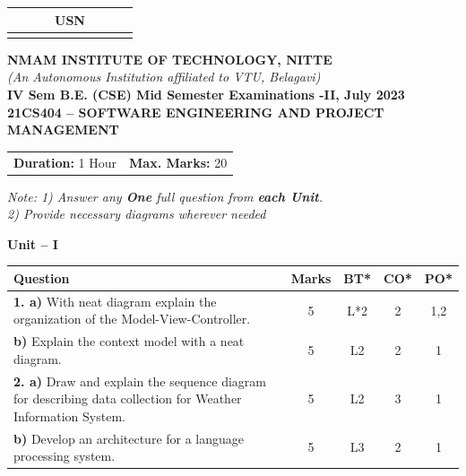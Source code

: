 \documentclass[12pt,a4paper]{article}
\begin{document}
\begin{center}
\begin{tabular}{|c|c|c|c|c|c|c|c|c|c|}
\hline
\multicolumn{10}{|c|}{USN} \\
\hline
& & & & & & & & & \\
\hline
\end{tabular}

\vspace{0.5cm}

{\Large \textbf{NMAM INSTITUTE OF TECHNOLOGY, NITTE}}\\[0.2cm]
{\small \textit{(An Autonomous Institution affiliated to VTU, Belagavi)}}\\[0.3cm]
{\large \textbf{IV Sem B.E. (CSE) Mid Semester Examinations -II, July 2023}}\\[0.2cm]
{\large \textbf{21CS404 -- SOFTWARE ENGINEERING AND PROJECT MANAGEMENT}}\\[0.3cm]
\end{center}

\noindent
\begin{tabular}{p{8cm}r}
\textbf{Duration:} 1 Hour & \textbf{Max. Marks:} 20
\end{tabular}

\vspace{0.3cm}
\begin{center}
\textit{Note: 1) Answer any \textbf{One} full question from \textbf{each Unit}.}\\
\textit{2) Provide necessary diagrams wherever needed}
\end{center}

\vspace{0.3cm}

\begin{center}
{\large \textbf{Unit -- I}}
\end{center}

\noindent
\begin{tabular}{|p{10.5cm}|c|c|c|c|}
\hline
\textbf{Question} & \textbf{Marks} & \textbf{BT*} & \textbf{CO*} & \textbf{PO*} \\
\hline
\textbf{1. a)} With neat diagram explain the organization of the Model-View-Controller. & 5 & L*2 & 2 & 1,2 \\
\hline
\textbf{b)} Explain the context model with a neat diagram. & 5 & L2 & 2 & 1 \\
\hline
\textbf{2. a)} Draw and explain the sequence diagram for describing data collection for Weather Information System. & 5 & L2 & 3 & 1 \\
\hline
\textbf{b)} Develop an architecture for a language processing system. & 5 & L3 & 2 & 1 \\
\hline
\end{tabular}
\end{document}
